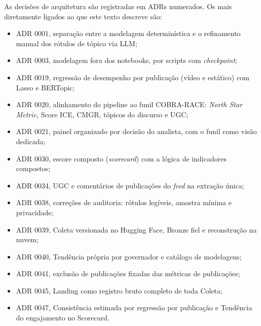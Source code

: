 As decisões de arquitetura são registradas em ADRs numerados. Os mais diretamente ligados ao que este texto descreve são:

\begin{itemize}
    \item ADR 0001, separação entre a modelagem determinística e o refinamento manual dos rótulos de tópico via LLM;
    \item ADR 0003, modelagem fora dos notebooks, por scripts com \emph{checkpoint};
    \item ADR 0019, regressão de desempenho por publicação (vídeo e estático) com Lasso e BERTopic;
    \item ADR 0020, alinhamento do pipeline ao funil COBRA-RACE: \emph{North Star Metric}, Score ICE, CMGR, tópicos do discurso e UGC;
    \item ADR 0021, painel organizado por decisão do analista, com o funil como visão dedicada;
    \item ADR 0030, escore composto (\emph{scorecard}) com a lógica de indicadores compostos;
    \item ADR 0034, UGC e comentários de publicações do \emph{feed} na extração única;
    \item ADR 0038, correções de auditoria: rótulos legíveis, amostra mínima e privacidade;
    \item ADR 0039, Coleta versionada no Hugging Face, Bronze fiel e reconstrução na nuvem;
    \item ADR 0040, Tendência própria por governador e catálogo de modelagens;
    \item ADR 0041, exclusão de publicações fixadas das métricas de publicações;
    \item ADR 0045, Landing como registro bruto completo de toda Coleta;
    \item ADR 0047, Consistência estimada por regressão por publicação e Tendência do engajamento no Scorecard.
\end{itemize}
